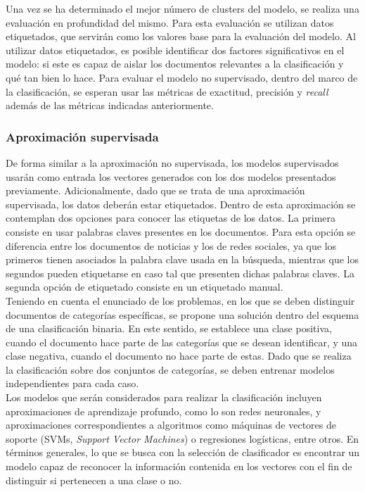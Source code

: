 Una vez se ha determinado el mejor número de clusters del modelo, se realiza una evaluación en profundidad del mismo. Para esta evaluación se utilizan datos etiquetados, que servirán como los valores base para la evaluación del modelo. Al utilizar datos etiquetados, es posible identificar dos factores significativos en el modelo: si este es capaz de aislar los documentos relevantes a la clasificación y qué tan bien lo hace. Para evaluar el modelo no supervisado, dentro del marco de la clasificación, se esperan usar las métricas de exactitud, precisión y \textit{recall} además de las métricas indicadas anteriormente. 

\subsubsection{Aproximación supervisada}
De forma similar a la aproximación no supervisada, los modelos supervisados usarán como entrada los vectores generados con los dos modelos presentados previamente. Adicionalmente, dado que se trata de una aproximación supervisada, los datos deberán estar etiquetados. Dentro de esta aproximación se contemplan dos opciones para conocer las etiquetas de los datos. La primera consiste en usar palabras claves presentes en los documentos. Para esta opción se diferencia entre los documentos de noticias y los de redes sociales, ya que los primeros tienen asociados la palabra clave usada en la búsqueda, mientras que los segundos pueden etiquetarse en caso tal que presenten dichas palabras claves. La segunda opción de etiquetado consiste en un etiquetado manual. \\

Teniendo en cuenta el enunciado de los problemas, en los que se deben distinguir documentos de categorías específicas, se propone una solución dentro del esquema de una clasificación binaria. En este sentido, se establece una clase positiva, cuando el documento hace parte de las categorías que se desean identificar, y una clase negativa, cuando el documento no hace parte de estas. Dado que se realiza la clasificación sobre dos conjuntos de categorías, se deben entrenar modelos independientes para cada caso. \\

Los modelos que serán considerados para realizar la clasificación incluyen aproximaciones de aprendizaje profundo, como lo son redes neuronales, y aproximaciones correspondientes a algoritmos como máquinas de vectores de soporte (SVMs, \textit{Support Vector Machines}) o regresiones logísticas, entre otros. En términos generales, lo que se busca con la selección de clasificador es encontrar un modelo capaz de reconocer la información contenida en los vectores con el fin de distinguir si pertenecen a una clase o no.

